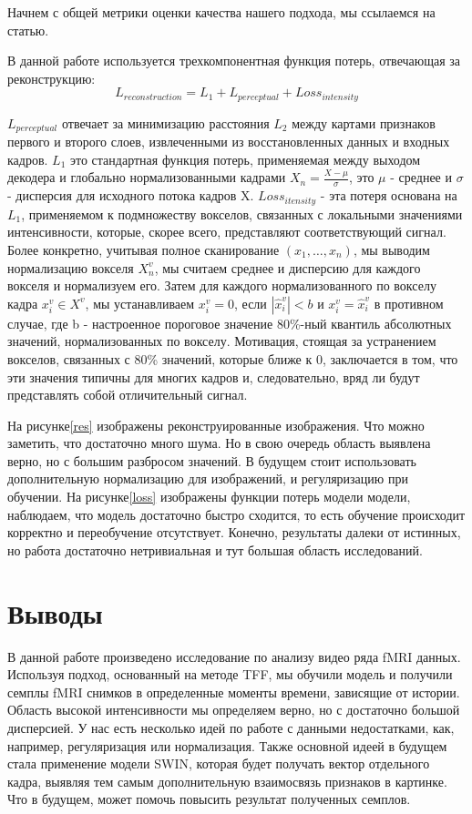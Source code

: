 \documentclass{article}
\begin{document}
Начнем с общей метрики оценки качества нашего подхода, мы ссылаемся на статью\cite{malkiel2022self}.

В данной работе используется трехкомпонентная функция потерь, отвечающая за реконструкцию:
\[L_{reconstruction} = L_1 + L_{perceptual} + Loss_{intensity}\]

$L_{perceptual}$ отвечает за минимизацию расстояния $L_2$
между картами признаков первого и второго слоев, извлеченными из восстановленных данных и входных кадров. $L_1$ это стандартная функция потерь, применяемая между выходом декодера и глобально нормализованными кадрами $X_n = \frac{X - \mu}{\sigma}$, это $\mu$ - среднее и $\sigma$ - дисперсия для исходного потока кадров X. $Loss_{itensity}$ - эта потеря основана на $L_1$, применяемом к подмножеству вокселов, связанных с локальными значениями интенсивности, которые, скорее
всего, представляют соответствующий сигнал. Более конкретно, учитывая полное сканирование $(x_1, \dots , x_n)$, мы
выводим нормализацию вокселя $X^v_n$, мы считаем среднее и дисперсию для каждого вокселя и нормализуем его. Затем для каждого нормализованного по вокселу кадра $x^v_i \in X^v$, мы
устанавливаем $x^v_i = 0$, если $|\hat{x}^v_i| < b$ и $x^v_i = \hat{x}^v_i$ в противном случае, где b - настроенное пороговое значение 80\%-ный квантиль абсолютных значений, нормализованных по вокселу. Мотивация, стоящая за устранением вокселов, связанных с 80\% значений, которые ближе к 0, заключается в том, что эти значения типичны для многих кадров и, следовательно, вряд ли будут представлять собой отличительный сигнал. 

На рисунке\ref{res} изображены реконструированные изображения. Что можно заметить, что достаточно много шума. Но в свою очередь область выявлена верно, но с большим разбросом значений. В будущем стоит использовать дополнительную нормализацию для изображений, и регуляризацию при обучении. На рисунке\ref{loss} изображены функции потерь модели модели, наблюдаем, что модель достаточно быстро сходится, то есть обучение происходит корректно и переобучение отсутствует. Конечно, результаты далеки от истинных, но работа достаточно нетривиальная и тут большая область исследований.

\section{Выводы}

В данной работе произведено исследование по анализу видео ряда fMRI данных. Используя подход, основанный на методе TFF, мы обучили модель и получили семплы fMRI снимков в определенные моменты времени, зависящие от истории. Область высокой интенсивности мы определяем верно, но с достаточно большой дисперсией. У нас есть несколько идей по работе с данными недостатками, как, например, регуляризация или нормализация. Также основной идеей в будущем стала применение модели SWIN, которая будет получать вектор отдельного кадра, выявляя тем самым дополнительную взаимосвязь признаков в картинке. Что в будущем, может помочь повысить результат полученных семплов.

 
\end{document}
